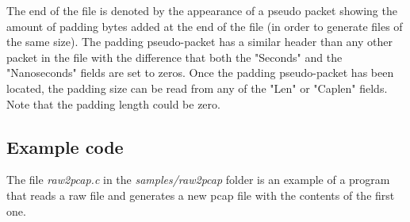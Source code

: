 The end of the file is denoted by the appearance of a pseudo packet showing the amount of padding bytes added at the end of the file (in order to generate files of the same size).
The padding pseudo-packet has a similar header than any other packet in the file with the difference that both the "Seconds" and the "Nanoseconds" fields are set to zeros.
Once the padding pseudo-packet has been located, the padding size can be read from any of the "Len" or "Caplen" fields. Note that the padding length could be zero.

\subsection{Example code}

The file \textit{raw2pcap.c} in the \textit{samples/raw2pcap} folder is an example of a program that reads a raw file and generates a new pcap file with the contents of the first one.



